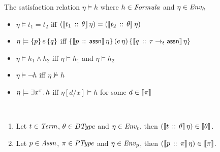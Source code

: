 \documentclass[12pt,a4paper]{report}
\begin{document}
\noindent The satisfaction relation $\eta \models h$ where $h \in \mathit{Formula}$ and $\eta \in \mathit{Env}_h$
\begin{itemize}
  \item $\eta \models t_1 = t_2$ iff $(\llbracket t_1\,\mathrel{::}\,\theta\rrbracket\,\eta) = (\llbracket t_2\,\mathrel{::}\,\theta\rrbracket\,\eta)$

  \item $\eta \models \{p\}\,e\,\{q\}$ iff
        $\{\llbracket p\,\mathrel{::}\,\mathsf{assn}\rrbracket\,\eta\}\,(e\,\eta)\,\{\llbracket q\,\mathrel{::}\,\tau\rightarrow_t\mathsf{assn}\rrbracket\,\eta\}$

  \item $\eta \models h_1 \wedge h_2$ iff $\eta \models h_1$ and $\eta \models h_2$

  \item $\eta \models \neg h$ iff $\eta \not\models h$
  
  \item $\eta \models \exists x^\pi.\,h$ iff $\eta[d/x] \models h$ for some $d \in \llbracket\pi\rrbracket$
\end{itemize}


\begin{lemma} \
  \begin{enumerate}
    \item Let $t \in\mathit{Term}$, $\theta\in\mathit{DType}$ and $\eta\in\mathit{Env}_t$, then
          $(\llbracket t\,\mathrel{::}\,\theta\rrbracket\,\eta) \in \llbracket\theta\rrbracket$.
    \item Let $p \in\mathit{Assn}$, $\pi\in\mathit{PType}$ and $\eta\in\mathit{Env}_p$, then
          $(\llbracket p\,\mathrel{::}\,\pi\rrbracket\,\eta) \in \llbracket\pi\rrbracket$.
  \end{enumerate}
\end{lemma}
\end{document}
